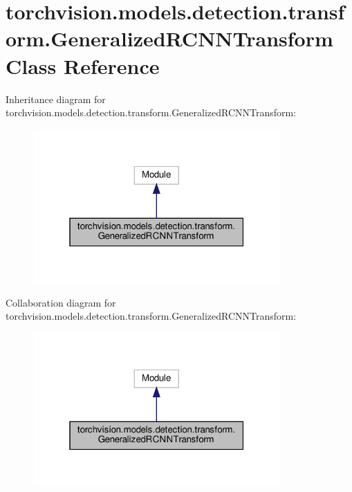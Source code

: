 \hypertarget{classtorchvision_1_1models_1_1detection_1_1transform_1_1GeneralizedRCNNTransform}{}\section{torchvision.\+models.\+detection.\+transform.\+Generalized\+R\+C\+N\+N\+Transform Class Reference}
\label{classtorchvision_1_1models_1_1detection_1_1transform_1_1GeneralizedRCNNTransform}


Inheritance diagram for torchvision.\+models.\+detection.\+transform.\+Generalized\+R\+C\+N\+N\+Transform\+:
\nopagebreak
\begin{figure}[H]
\begin{center}
\leavevmode
\includegraphics[width=268pt]{classtorchvision_1_1models_1_1detection_1_1transform_1_1GeneralizedRCNNTransform__inherit__graph}
\end{center}
\end{figure}


Collaboration diagram for torchvision.\+models.\+detection.\+transform.\+Generalized\+R\+C\+N\+N\+Transform\+:
\nopagebreak
\begin{figure}[H]
\begin{center}
\leavevmode
\includegraphics[width=268pt]{classtorchvision_1_1models_1_1detection_1_1transform_1_1GeneralizedRCNNTransform__coll__graph}
\end{center}
\end{figure}
